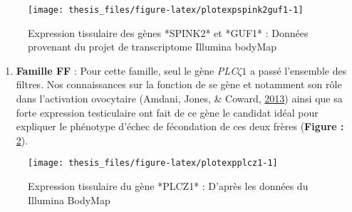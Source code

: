 \documentclass[12pt,twoside]{reedthesis}
\providecommand{\tightlist}{%
  \setlength{\itemsep}{0pt}\setlength{\parskip}{0pt}}
\theoremstyle{definition}
\theoremstyle{definition}
\theoremstyle{remark}
\begin{document}
  \begin{figure}
  
  {\centering \texttt{[image: thesis\_files/figure-latex/plotexpspink2guf1-1]} 
  
  }
  
  \caption[Expression tissulaire des gènes *SPINK2* et *GUF1*]{Expression tissulaire des gènes *SPINK2* et *GUF1* : Données provenant du projet de transcriptome Illumina bodyMap}\label{fig:plotexpspink2guf1}
  \end{figure}
  
  \begin{enumerate}
  \def\labelenumi{\arabic{enumi}.}
  \setcounter{enumi}{1}
  \tightlist
  \item
    \textbf{Famille FF} : Pour cette famille, seul le gène
    \emph{PLC}\(\zeta 1\) a passé l'ensemble des filtres. Nos
    connaissances sur la fonction de se gène et notamment son rôle dans
    l'activation ovocytaire (Amdani, Jones, \& Coward,
    \protect\hyperlink{ref-Amdani2013}{2013}) ainsi que sa forte
    expression testiculaire ont fait de ce gène le candidat idéal pour
    expliquer le phénotype d'échec de fécondation de ces deux frères
    (\textbf{Figure : }\ref{fig:plotexpplcz1}).
  \end{enumerate}
  
  \begin{figure}
  
  {\centering \texttt{[image: thesis\_files/figure-latex/plotexpplcz1-1]} 
  
  }
  
  \caption[Expression tissulaire du gène *PLCZ1*]{Expression tissulaire du gène *PLCZ1* : D'après les données du Illumina BodyMap}\label{fig:plotexpplcz1}
  \end{figure}
  
\end{document}
